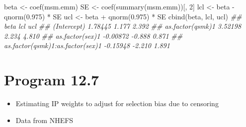 \documentclass[
  10pt,
  a4paper,
]{book}
\newenvironment{Shaded}{\begin{snugshade}}{\end{snugshade}}
\newcommand{\DecValTok}[1]{\textcolor[rgb]{0.68,0.00,0.00}{#1}}
\newcommand{\DocumentationTok}[1]{\textcolor[rgb]{0.37,0.37,0.37}{\textit{#1}}}
\newcommand{\FloatTok}[1]{\textcolor[rgb]{0.68,0.00,0.00}{#1}}
\newcommand{\FunctionTok}[1]{\textcolor[rgb]{0.28,0.35,0.67}{#1}}
\newcommand{\NormalTok}[1]{\textcolor[rgb]{0.00,0.46,0.62}{#1}}
\newcommand{\OtherTok}[1]{\textcolor[rgb]{0.00,0.46,0.62}{#1}}
\newcommand{\SpecialCharTok}[1]{\textcolor[rgb]{0.37,0.37,0.37}{#1}}
\providecommand{\tightlist}{%
  \setlength{\itemsep}{0pt}\setlength{\parskip}{0pt}}
\begin{document}
\begin{Shaded}
\begin{Highlighting}[]
\NormalTok{beta }\OtherTok{\textless{}{-}} \FunctionTok{coef}\NormalTok{(msm.emm)}
\NormalTok{SE }\OtherTok{\textless{}{-}} \FunctionTok{coef}\NormalTok{(}\FunctionTok{summary}\NormalTok{(msm.emm))[, }\DecValTok{2}\NormalTok{]}
\NormalTok{lcl }\OtherTok{\textless{}{-}}\NormalTok{ beta }\SpecialCharTok{{-}} \FunctionTok{qnorm}\NormalTok{(}\FloatTok{0.975}\NormalTok{) }\SpecialCharTok{*}\NormalTok{ SE}
\NormalTok{ucl }\OtherTok{\textless{}{-}}\NormalTok{ beta }\SpecialCharTok{+} \FunctionTok{qnorm}\NormalTok{(}\FloatTok{0.975}\NormalTok{) }\SpecialCharTok{*}\NormalTok{ SE}
\FunctionTok{cbind}\NormalTok{(beta, lcl, ucl)}
\DocumentationTok{\#\#                                      beta    lcl   ucl}
\DocumentationTok{\#\# (Intercept)                       1.78445  1.177 2.392}
\DocumentationTok{\#\# as.factor(qsmk)1                  3.52198  2.234 4.810}
\DocumentationTok{\#\# as.factor(sex)1                  {-}0.00872 {-}0.888 0.871}
\DocumentationTok{\#\# as.factor(qsmk)1:as.factor(sex)1 {-}0.15948 {-}2.210 1.891}
\end{Highlighting}
\end{Shaded}

\section{Program 12.7}\label{program-12.7}

\begin{itemize}
\tightlist
\item
  Estimating IP weights to adjust for selection bias due to censoring
\item
  Data from NHEFS
\end{itemize}
\end{document}
